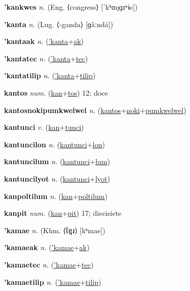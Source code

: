 \textbf{\hypertarget{'kankwes}{'kankwes}} \textit{n.} (Eng. ⟨congress⟩ [ˈkʰɑŋɡɹʷɨs])


\textbf{\hypertarget{'kanta}{'kanta}} \textit{n.} (Lug. ⟨-ganda⟩ [ɡâːndá])


\textbf{\hypertarget{'kantaak}{'kantaak}} \textit{n.} (\hyperlink{'kanta}{'kanta}+\allowbreak \hyperlink{ak}{ak})


\textbf{\hypertarget{'kantatec}{'kantatec}} \textit{n.} (\hyperlink{'kanta}{'kanta}+\allowbreak \hyperlink{tec}{tec})


\textbf{\hypertarget{'kantatilip}{'kantatilip}} \textit{n.} (\hyperlink{'kanta}{'kanta}+\allowbreak \hyperlink{tilip}{tilip})


\textbf{\hypertarget{kantos}{kantos}} \textit{num.} (\hyperlink{kan}{kan}+\allowbreak \hyperlink{tos}{tos})
12; doce

\textbf{\hypertarget{kantosnokipumkwelwel}{kantosnokipumkwelwel}} \textit{n.} (\hyperlink{kantos}{kantos}+\allowbreak \hyperlink{noki}{noki}+\allowbreak \hyperlink{pumkwelwel}{pumkwelwel})


\textbf{\hypertarget{kantunci}{kantunci}} \textit{v.} (\hyperlink{kan}{kan}+\allowbreak \hyperlink{tunci}{tunci})


\textbf{\hypertarget{kantuncilon}{kantuncilon}} \textit{n.} (\hyperlink{kantunci}{kantunci}+\allowbreak \hyperlink{lon}{lon})


\textbf{\hypertarget{kantuncilum}{kantuncilum}} \textit{n.} (\hyperlink{kantunci}{kantunci}+\allowbreak \hyperlink{lum}{lum})


\textbf{\hypertarget{kantuncilyot}{kantuncilyot}} \textit{n.} (\hyperlink{kantunci}{kantunci}+\allowbreak \hyperlink{lyot}{lyot})


\textbf{\hypertarget{kanpoltilum}{kanpoltilum}} \textit{n.} (\hyperlink{kan}{kan}+\allowbreak \hyperlink{poltilum}{poltilum})


\textbf{\hypertarget{kanpit}{kanpit}} \textit{num.} (\hyperlink{kan}{kan}+\allowbreak \hyperlink{pit}{pit})
17; diecisiete

\textbf{\hypertarget{'kamae}{'kamae}} \textit{n.} (Khm. ⟨{\khmer{}ខ្មែរ}⟩ [kʰmae])


\textbf{\hypertarget{'kamaeak}{'kamaeak}} \textit{n.} (\hyperlink{'kamae}{'kamae}+\allowbreak \hyperlink{ak}{ak})


\textbf{\hypertarget{'kamaetec}{'kamaetec}} \textit{n.} (\hyperlink{'kamae}{'kamae}+\allowbreak \hyperlink{tec}{tec})


\textbf{\hypertarget{'kamaetilip}{'kamaetilip}} \textit{n.} (\hyperlink{'kamae}{'kamae}+\allowbreak \hyperlink{tilip}{tilip})



